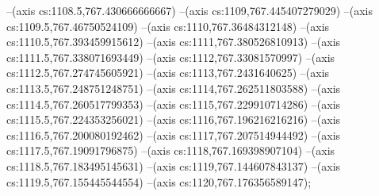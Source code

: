 --(axis cs:1108.5,767.430666666667)
--(axis cs:1109,767.445407279029)
--(axis cs:1109.5,767.46750524109)
--(axis cs:1110,767.36484312148)
--(axis cs:1110.5,767.393459915612)
--(axis cs:1111,767.380526810913)
--(axis cs:1111.5,767.338071693449)
--(axis cs:1112,767.33081570997)
--(axis cs:1112.5,767.274745605921)
--(axis cs:1113,767.2431640625)
--(axis cs:1113.5,767.248751248751)
--(axis cs:1114,767.262511803588)
--(axis cs:1114.5,767.260517799353)
--(axis cs:1115,767.229910714286)
--(axis cs:1115.5,767.224353256021)
--(axis cs:1116,767.196216216216)
--(axis cs:1116.5,767.200080192462)
--(axis cs:1117,767.207514944492)
--(axis cs:1117.5,767.19091796875)
--(axis cs:1118,767.169398907104)
--(axis cs:1118.5,767.183495145631)
--(axis cs:1119,767.144607843137)
--(axis cs:1119.5,767.155445544554)
--(axis cs:1120,767.176356589147);
